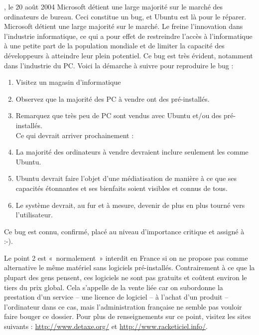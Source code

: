 \begin{citationlongue}{, le 20 août 2004}
Microsoft détient une large majorité sur le marché des ordinateurs de bureau. Ceci constitue un bug, et Ubuntu est là pour le réparer.\\
Microsoft détient une large majorité sur le marché. Le  freine l'innovation dans l'industrie informatique, ce qui a pour effet de restreindre l'accès à l'informatique à une petite part de la population mondiale et de limiter la capacité des développeurs à atteindre leur plein potentiel. Ce bug est très évident, notamment dans l'industrie du PC.
Voici la démarche à suivre pour reproduire le bug :
\begin{enumerate}
\item Visitez un magasin d'informatique
\item Observez que la majorité des PC à vendre ont des  pré-installés.
\item Remarquez que très peu de PC sont vendus avec Ubuntu et/ou des  pré-installés.\\
Ce qui devrait arriver prochainement :
\item La majorité des ordinateurs à vendre devraient inclure seulement les  comme Ubuntu.
\item Ubuntu devrait faire l'objet d'une médiatisation de manière à ce que ses capacités étonnantes et ses bienfaits soient visibles et connus de tous.
\item Le système devrait, au fur et à mesure, devenir de plus en plus tourné vers l'utilisateur.
\end{enumerate}
\end{citationlongue}
Ce bug est connu, confirmé, placé au niveau d'importance critique et assigné à  :-).\par
\begin{nota}
Le point 2 est «~normalement~» interdit en France si on ne propose pas comme alternative le même matériel sans logiciels pré-installés. Contrairement à ce que la plupart des gens pensent, ces logiciels ne sont pas gratuits et coûtent environ le tiers du prix global. Cela s'appelle de la vente liée car on subordonne la prestation d'un service -- une licence de logiciel -- à l'achat d'un produit -- l'ordinateur dans ce cas, mais l'administration française ne semble pas vouloir faire bouger ce dossier. Pour plus de renseignements sur ce point, visitez les sites suivants : \url{http://www.detaxe.org/} et \url{http://www.racketiciel.info/}.
\end{nota}
